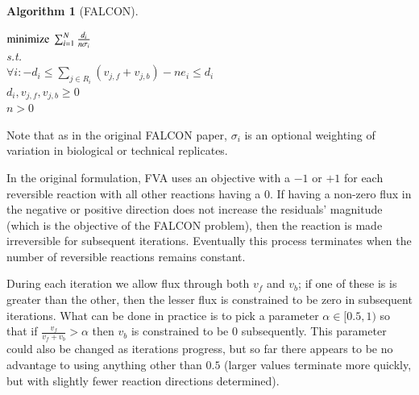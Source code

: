 \documentclass[phd,tocprelim]{cornell}
\newcommand{\INDSTATE}[1][1]{\STATE\hspace{#1\algorithmicindent}}
\theoremstyle{break}
\newtheorem{Algorithm}{Algorithm}
\theoremstyle{empty}
\begin{document}
\pagebreak
\begin{Algorithm}[FALCON]
\label{alg:FALCON}
\begin{algorithmic}
  \INDSTATE {(either forward or backward) to a nonzero value.}
  \ELSE 
  \ENDIF
  \INDSTATE $\textnormal{minimize}\ \sum^N_{i=1}\frac{d_i}{n \sigma_i}$  \\
  \INDSTATE s.t. \\
  \INDSTATE $\forall i: -d_i \leq \sum_{j \in R_i}(v_{j,f} + v_{j,b}) - n e_i \leq d_i$ \\
  \INDSTATE $d_i, v_{j,f}, v_{j,b} \geq 0$ \\
  \INDSTATE $n > 0$
  \ENDIF
  \ENDIF
  \ENDFOR
\ENDWHILE
\end{algorithmic}
\end{Algorithm}
Note that as in the original FALCON paper, $\sigma_i$ is an optional weighting of variation
in biological or technical replicates. 

In the original formulation, FVA uses an objective with a $-1$ or $+1$ for each reversible reaction 
with all other reactions having a 0. If having a non-zero flux in the negative or positive direction
does not increase the residuals' magnitude (which is the objective of the FALCON problem), then 
the reaction is made irreversible for subsequent iterations. Eventually this process terminates
when the number of reversible reactions remains constant. 

During each iteration we allow flux through both $v_f$ and $v_b$; if one of these is is greater 
than the other, then the lesser flux is constrained to be zero in subsequent iterations. What
can be done in practice is to pick a parameter $\alpha \in [0.5,1)$ so that if
$\frac{v_f}{v_f+v_b} > \alpha$ then $v_b$ is constrained to be 0 subsequently. This parameter could
also be changed as iterations progress, but so far there appears to be no advantage to using
anything other than $0.5$ (larger values terminate more quickly, but with slightly fewer reaction
directions determined).
\end{document}
